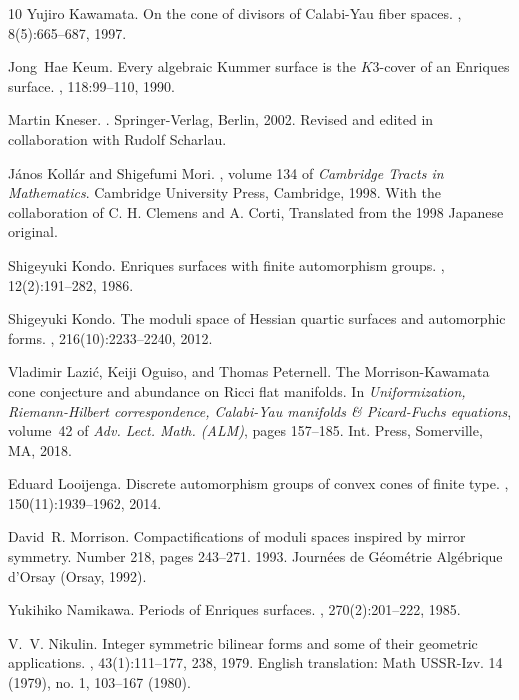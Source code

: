 \documentclass{amsart}
\numberwithin{procedure}{section}
\begin{document}
\begin{thebibliography}{10}
Yujiro Kawamata.
\newblock On the cone of divisors of {C}alabi-{Y}au fiber spaces.
, 8(5):665--687, 1997.

Jong~Hae Keum.
\newblock Every algebraic {K}ummer surface is the {$K3$}-cover of an {E}nriques
  surface.
, 118:99--110, 1990.

Martin Kneser.
.
\newblock Springer-Verlag, Berlin, 2002.
\newblock Revised and edited in collaboration with Rudolf Scharlau.

J\'{a}nos Koll\'{a}r and Shigefumi Mori.
, volume 134 of {\em
  Cambridge Tracts in Mathematics}.
\newblock Cambridge University Press, Cambridge, 1998.
\newblock With the collaboration of C. H. Clemens and A. Corti, Translated from
  the 1998 Japanese original.

Shigeyuki Kondo.
\newblock Enriques surfaces with finite automorphism groups.
, 12(2):191--282, 1986.

Shigeyuki Kondo.
\newblock The moduli space of {H}essian quartic surfaces and automorphic forms.
, 216(10):2233--2240, 2012.

Vladimir Lazi\'{c}, Keiji Oguiso, and Thomas Peternell.
\newblock The {M}orrison-{K}awamata cone conjecture and abundance on {R}icci
  flat manifolds.
\newblock In {\em Uniformization, {R}iemann-{H}ilbert correspondence,
  {C}alabi-{Y}au manifolds \& {P}icard-{F}uchs equations}, volume~42 of {\em
  Adv. Lect. Math. (ALM)}, pages 157--185. Int. Press, Somerville, MA, 2018.

Eduard Looijenga.
\newblock Discrete automorphism groups of convex cones of finite type.
, 150(11):1939--1962, 2014.

David~R. Morrison.
\newblock Compactifications of moduli spaces inspired by mirror symmetry.
\newblock Number 218, pages 243--271. 1993.
\newblock Journ\'{e}es de G\'{e}om\'{e}trie Alg\'{e}brique d'Orsay (Orsay,
  1992).

Yukihiko Namikawa.
\newblock Periods of {E}nriques surfaces.
, 270(2):201--222, 1985.

V.~V. Nikulin.
\newblock Integer symmetric bilinear forms and some of their geometric
  applications.
, 43(1):111--177, 238, 1979.
\newblock English translation: Math USSR-Izv. 14 (1979), no. 1, 103--167
  (1980).


\end{thebibliography}
\end{document}

